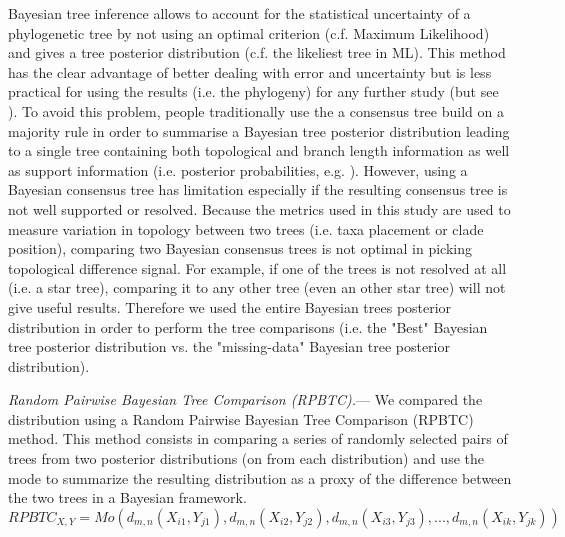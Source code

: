 \documentclass[12pt,letterpaper]{article}
\renewcommand{\subsubsection}[1]{%
\vspace{2ex}
\noindent
\textit{#1.}---}
\begin{document}
Bayesian tree inference allows to account for the statistical uncertainty of a phylogenetic tree by not using an optimal criterion (c.f. Maximum Likelihood) and gives a tree posterior distribution (c.f. the likeliest tree in ML).
This method has the clear advantage of better dealing with error and uncertainty but is less practical for using the results (i.e. the phylogeny) for any further study (but see \citet{healyecology2014}).
To avoid this problem, people traditionally use the a consensus tree build on a majority rule in order to summarise a Bayesian tree posterior distribution leading to a single tree containing both topological and branch length information as well as support information (i.e. posterior probabilities, e.g. \citet{Ronquist2012mrbayes}).
However, using a Bayesian consensus tree has limitation especially if the resulting consensus tree is not well supported or resolved.
Because the metrics used in this study are used to measure variation in topology between two trees (i.e. taxa placement or clade position), comparing two Bayesian consensus trees is not optimal in picking topological difference signal.
For example, if one of the trees is not resolved at all (i.e. a star tree), comparing it to any other tree (even an other star tree) will not give useful results.
Therefore we used the entire Bayesian trees posterior distribution in order to perform the tree comparisons (i.e. the "Best" Bayesian tree posterior distribution vs. the "missing-data" Bayesian tree posterior distribution).

\subsubsection{Random Pairwise Bayesian Tree Comparison (RPBTC)}
We compared the distribution using a Random Pairwise Bayesian Tree Comparison (RPBTC) method.
This method consists in comparing a series of randomly selected pairs of trees from two posterior distributions (on from each distribution) and use the mode to summarize the resulting distribution as a proxy of the difference between the two trees in a Bayesian framework.
\begin{equation}
RPBTC_{X,Y}=Mo(d_{m,n}(X_{i1},Y_{j1}),d_{m,n}(X_{i2},Y_{j2}),d_{m,n}(X_{i3},Y_{j3}), ... ,d_{m,n}(X_{ik},Y_{jk}))
\end{equation}
\end{document}
